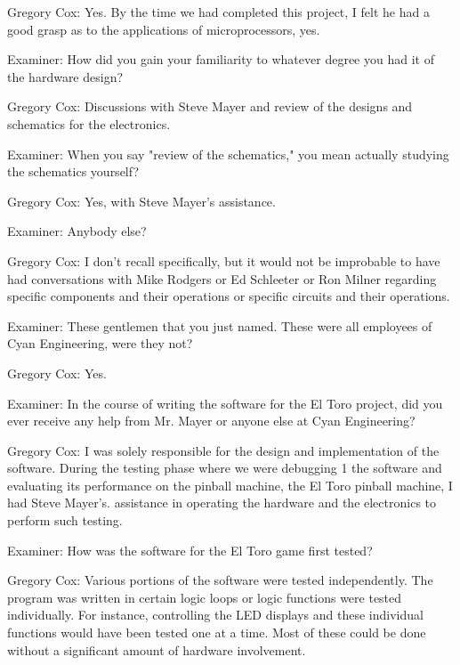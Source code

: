 \textcolor{interviewee}{Gregory Cox:} Yes. By the time we had completed this project, I felt he had a good grasp as to the applications of microprocessors, yes. 

\textcolor{interviewer}{Examiner:} How did you gain your familiarity to whatever degree you had it of the hardware design? 

\textcolor{interviewee}{Gregory Cox:} Discussions with Steve Mayer and review of the designs and schematics for the electronics. 

\textcolor{interviewer}{Examiner:} When you say "review of the schematics," you mean actually studying the schematics yourself? 

\textcolor{interviewee}{Gregory Cox:} Yes, with Steve Mayer’s assistance. 

\textcolor{interviewer}{Examiner:} Anybody else?

\textcolor{interviewee}{Gregory Cox:} I don’t recall specifically, but it would not be improbable to have had conversations with Mike Rodgers or Ed Schleeter or Ron Milner regarding specific components and their operations or specific circuits and their operations.

\textcolor{interviewer}{Examiner:} These gentlemen that you just named. These were all employees of Cyan Engineering, were they not? 

\textcolor{interviewee}{Gregory Cox:} Yes.

\textcolor{interviewer}{Examiner:} In the course of writing the software for the El Toro project, did you ever receive any help from Mr. Mayer or anyone else at Cyan Engineering? 

\textcolor{interviewee}{Gregory Cox:} I was solely responsible for the design and implementation of the software. During the testing phase where we were debugging 1 the software and evaluating its performance on the pinball machine, the El Toro pinball machine, I had Steve Mayer's. assistance in operating the hardware and the electronics to perform such testing. 

\textcolor{interviewer}{Examiner:} How was the software for the El Toro game first tested? 

\textcolor{interviewee}{Gregory Cox:} Various portions of the software were tested independently. The program was written in certain logic loops or logic functions were tested individually. For instance, controlling the LED displays and these individual functions would have been tested one at a time. Most of these could be done without a significant amount of hardware involvement. 


